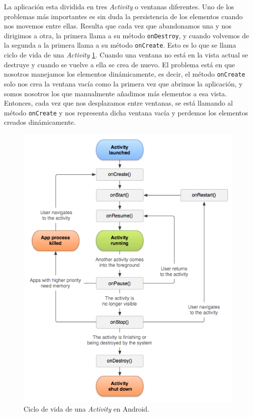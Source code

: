 La aplicación esta dividida en tres \textit{Activity} o ventanas diferentes. Uno de los problemas más importantes es sin duda la persistencia de los elementos cuando nos movemos entre ellas. Resulta que cada vez que abandonamos una y nos dirigimos a otra, la primera llama a su método \verb|onDestroy|, y cuando volvemos de la segunda a la primera llama a su método \verb|onCreate|. Esto es lo que se llama ciclo de vida de una \textit{Activity} \ref{fig:cicloDeVida}. Cuando una ventana no está en la vista actual se destruye y cuando se vuelve a ella se crea de nuevo. El problema está en que nosotros manejamos los elementos dinámicamente, es decir, el método \verb|onCreate| solo nos crea la ventana vacía como la primera vez que abrimos la aplicación, y somos nosotros los que manualmente añadimos más elementos a esa vista. Entonces, cada vez que nos desplazamos entre ventanas, se está llamando al método \verb|onCreate| y nos representa dicha ventana vacía y perdemos los elementos creados dinámicamente.

\begin{figure}[h!]
	\centering
	\includegraphics[width=1\linewidth]{img/cicloDeVida}
	\caption{Ciclo de vida de una \textit{Activity} en Android.}
	\label{fig:cicloDeVida}
\end{figure}

